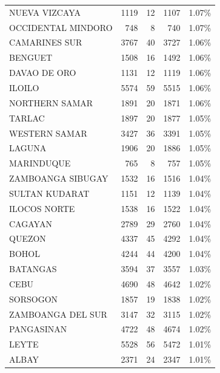 \begin{tabular}{lrrrr}
NUEVA VIZCAYA & 1119 & 12 & 1107 & 1.07\% \\
OCCIDENTAL MINDORO & 748 & 8 & 740 & 1.07\% \\
CAMARINES SUR & 3767 & 40 & 3727 & 1.06\% \\
BENGUET & 1508 & 16 & 1492 & 1.06\% \\
DAVAO DE ORO & 1131 & 12 & 1119 & 1.06\% \\
ILOILO & 5574 & 59 & 5515 & 1.06\% \\
NORTHERN SAMAR & 1891 & 20 & 1871 & 1.06\% \\
TARLAC & 1897 & 20 & 1877 & 1.05\% \\
WESTERN SAMAR & 3427 & 36 & 3391 & 1.05\% \\
LAGUNA & 1906 & 20 & 1886 & 1.05\% \\
MARINDUQUE & 765 & 8 & 757 & 1.05\% \\
ZAMBOANGA SIBUGAY & 1532 & 16 & 1516 & 1.04\% \\
SULTAN KUDARAT & 1151 & 12 & 1139 & 1.04\% \\
ILOCOS NORTE & 1538 & 16 & 1522 & 1.04\% \\
CAGAYAN & 2789 & 29 & 2760 & 1.04\% \\
QUEZON & 4337 & 45 & 4292 & 1.04\% \\
BOHOL & 4244 & 44 & 4200 & 1.04\% \\
BATANGAS & 3594 & 37 & 3557 & 1.03\% \\
CEBU & 4690 & 48 & 4642 & 1.02\% \\
SORSOGON & 1857 & 19 & 1838 & 1.02\% \\
ZAMBOANGA DEL SUR & 3147 & 32 & 3115 & 1.02\% \\
PANGASINAN & 4722 & 48 & 4674 & 1.02\% \\
LEYTE & 5528 & 56 & 5472 & 1.01\% \\
ALBAY & 2371 & 24 & 2347 & 1.01\% \\
\bottomrule
\end{tabular}
